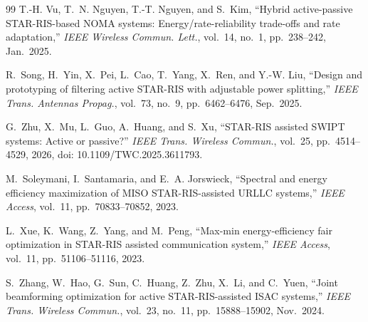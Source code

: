 \documentclass[journal]{IEEEtran}
\begin{document}
\begin{thebibliography}{99}
T.-H. Vu, T.~N. Nguyen, T.-T. Nguyen, and S.~Kim,
``Hybrid active-passive STAR-RIS-based NOMA systems: Energy/rate-reliability trade-offs and rate adaptation,''
\emph{IEEE Wireless Commun. Lett.}, vol.~14, no.~1, pp.~238--242, Jan.~2025.

R.~Song, H.~Yin, X.~Pei, L.~Cao, T.~Yang, X.~Ren, and Y.-W. Liu,
``Design and prototyping of filtering active STAR-RIS with adjustable power splitting,''
\emph{IEEE Trans. Antennas Propag.}, vol.~73, no.~9, pp.~6462--6476, Sep.~2025.

G.~Zhu, X.~Mu, L.~Guo, A.~Huang, and S.~Xu,
``STAR-RIS assisted SWIPT systems: Active or passive?''
\emph{IEEE Trans. Wireless Commun.}, vol.~25, pp.~4514--4529, 2026, doi: 10.1109/TWC.2025.3611793.

M.~Soleymani, I.~Santamaria, and E.~A. Jorswieck,
``Spectral and energy efficiency maximization of MISO STAR-RIS-assisted URLLC systems,''
\emph{IEEE Access}, vol.~11, pp.~70833--70852, 2023.

L.~Xue, K.~Wang, Z.~Yang, and M.~Peng,
``Max-min energy-efficiency fair optimization in STAR-RIS assisted communication system,''
\emph{IEEE Access}, vol.~11, pp.~51106--51116, 2023.

S.~Zhang, W.~Hao, G.~Sun, C.~Huang, Z.~Zhu, X.~Li, and C.~Yuen,
``Joint beamforming optimization for active STAR-RIS-assisted ISAC systems,''
\emph{IEEE Trans. Wireless Commun.}, vol.~23, no.~11, pp.~15888--15902, Nov.~2024.

\end{thebibliography}
\end{document}
